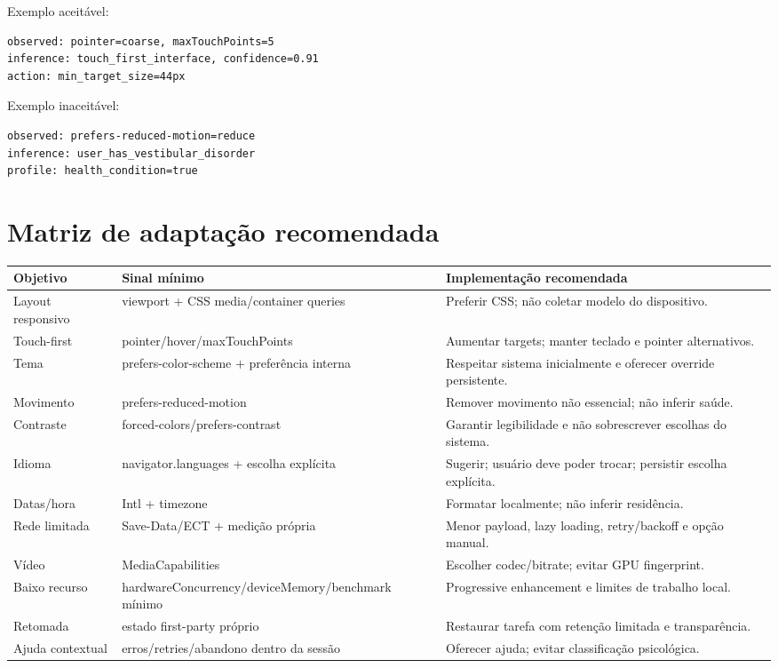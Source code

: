 \documentclass[11pt,a4paper]{article}
\begin{document}
Exemplo aceitável:
\begin{verbatim}
observed: pointer=coarse, maxTouchPoints=5
inference: touch_first_interface, confidence=0.91
action: min_target_size=44px
\end{verbatim}

Exemplo inaceitável:
\begin{verbatim}
observed: prefers-reduced-motion=reduce
inference: user_has_vestibular_disorder
profile: health_condition=true
\end{verbatim}

\section{Matriz de adaptação recomendada}
\begin{longtable}{p{3.4cm}p{4cm}p{6.3cm}}
\toprule
\textbf{Objetivo} & \textbf{Sinal mínimo} & \textbf{Implementação recomendada}\\\midrule\endhead
Layout responsivo & viewport + CSS media/container queries & Preferir CSS; não coletar modelo do dispositivo.\\
Touch-first & pointer/hover/maxTouchPoints & Aumentar targets; manter teclado e pointer alternativos.\\
Tema & prefers-color-scheme + preferência interna & Respeitar sistema inicialmente e oferecer override persistente.\\
Movimento & prefers-reduced-motion & Remover movimento não essencial; não inferir saúde.\\
Contraste & forced-colors/prefers-contrast & Garantir legibilidade e não sobrescrever escolhas do sistema.\\
Idioma & navigator.languages + escolha explícita & Sugerir; usuário deve poder trocar; persistir escolha explícita.\\
Datas/hora & Intl + timezone & Formatar localmente; não inferir residência.\\
Rede limitada & Save-Data/ECT + medição própria & Menor payload, lazy loading, retry/backoff e opção manual.\\
Vídeo & MediaCapabilities & Escolher codec/bitrate; evitar GPU fingerprint.\\
Baixo recurso & hardwareConcurrency/deviceMemory/benchmark mínimo & Progressive enhancement e limites de trabalho local.\\
Retomada & estado first-party próprio & Restaurar tarefa com retenção limitada e transparência.\\
Ajuda contextual & erros/retries/abandono dentro da sessão & Oferecer ajuda; evitar classificação psicológica.\\
\bottomrule
\end{longtable}
\end{document}
